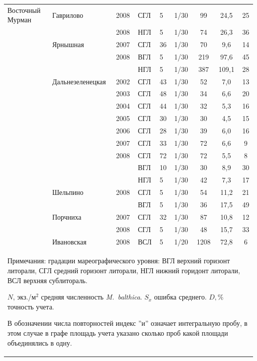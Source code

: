 \documentclass[12pt, a4paper]{disser}
\begin{document}
\begin{footnotesize}
\begin{longtable}{|p{2cm}|p{3cm}|p{1cm}|p{2cm}|p{1.5cm}|p{1cm}|*{3}{c|}}
	Восточный Мурман & Гаврилово & 2008 & СГЛ & 5 & 1/30 & 99 & 24,5 & 25
		\\ \cline{4-9}
		 &  & 2008 & НГЛ & 5 & 1/30 & 74 & 26,3 & 36
		\\ \cline{2-9}
		 & Ярнышная & 2007 & СГЛ & 36 & 1/30 & 70 & 9,6 & 14
		\\ \cline{3-9}
		 &  & 2008 & ВГЛ & 5 & 1/30 & 219 & 97,6 & 45
		\\ \cline{4-9}
		 &  & & НГЛ & 5 & 1/30 & 387 & 109,1 & 28
		\\ \cline{2-9}
		 & Дальнезеленецкая & 2002 & СГЛ & 43 & 1/30 & 52 & 7,0 & 13
		\\ \cline{3-9}
		 &  & 2003 & СГЛ & 48 & 1/30 & 34 & 6,6 & 20
		\\ \cline{3-9}
		 &  & 2004 & СГЛ & 44 & 1/30 & 32 & 5,3 & 16
		\\ \cline{3-9}
		 &  & 2005 & СГЛ & 30 & 1/30 & 30 & 4,5 & 15
		\\ \cline{3-9}
		 &  & 2006 & СГЛ & 28 & 1/30 & 39 & 6,0 & 16
		\\ \cline{3-9}
		 &  & 2007 & СГЛ & 33 & 1/30 & 72 & 6,6 & 9
		\\ \cline{3-9}
		 &  & 2008 & СГЛ & 72 & 1/30 & 72 & 5,5 & 8
		\\ \cline{4-9}
		 &  &  & ВГЛ & 10 & 1/30 & 30 & 8,9 & 30
		\\ \cline{4-9}
		 &  &  & НГЛ & 5 & 1/30 & 42 & 7,3 & 17
		\\ \cline{2-9}
		 & Шельпино & 2008 & СГЛ & 5 & 1/30 & 54 & 11,2 & 21
		\\ \cline{4-9}
		 &  &  & ВГЛ & 5 & 1/30 & 36 & 17,5 & 49
		\\ \cline{3-9}
		 & Порчниха & 2007 & СГЛ & 32 & 1/30 & 87 & 10,8 & 12
		\\ \cline{3-9}
		 &  & 2008 & СГЛ & 5 & 1/30 & 48 & 15,7 & 33
		\\ \cline{2-9}
		 & Ивановская & 2008 & ВСЛ & 5 & 1/20 & 1208 & 72,8 & 6
		\\ \hline
	\multicolumn{9}{p{16cm}}{Примечания: градации мареографического уровня: ВГЛ \textemdash верхний горизонт литорали, СГЛ \textemdash средний 	горизонт литорали, НГЛ \textemdash нижний горидонт литорали, ВСЛ \textemdash верхняя сублитораль. 

	$N$, экз./м$^2$ \textemdash средняя численность {\it M.~balthica}. 
	$S_x$ \textemdash ошибка среднего.
	 $D, \%$ \textemdash  точность учета.
	
	В обозначении числа повторностей индекс ''и'' означает интегральную пробу, в этом случае в графе площадь учета указано сколько проб какой площади 	объединялись в одну.}
	\end{longtable}
	\end{footnotesize}
\end{document}

